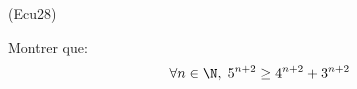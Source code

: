 \begin{tiny}(Ecu28)\end{tiny} Montrer que:
\begin{displaymath}
 \forall n \in \N, \; 5^{n+2} \geq 4^{n+2} + 3^{n+2}
\end{displaymath}
